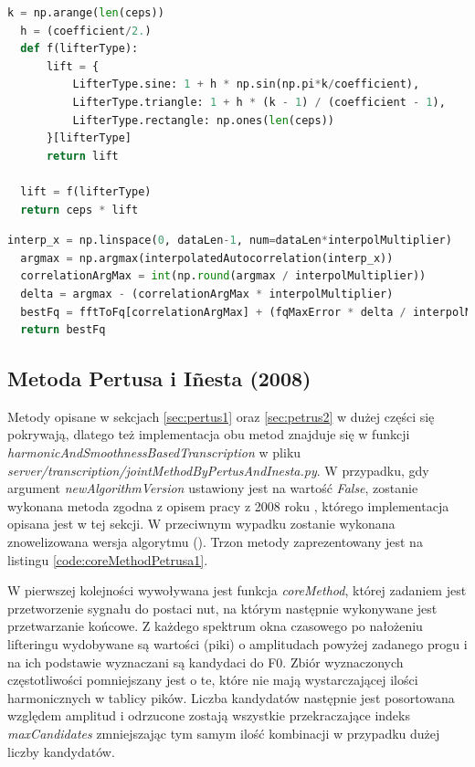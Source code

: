 \documentclass[12pt,a4paper,twoside]{mwart}
\begin{document}
\begin{lstlisting}[float, language=Python, caption={Filtrowanie w domenie quefrency}, captionpos=b, label={code:liftering}]
  k = np.arange(len(ceps))
  h = (coefficient/2.)
  def f(lifterType):
      lift = {
          LifterType.sine: 1 + h * np.sin(np.pi*k/coefficient),
          LifterType.triangle: 1 + h * (k - 1) / (coefficient - 1),
          LifterType.rectangle: np.ones(len(ceps))
      }[lifterType]
      return lift

  lift = f(lifterType)
  return ceps * lift
\end{lstlisting}

\begin{lstlisting}[float, language=Python, caption={Wyznaczanie F0 w ACLOS}, captionpos=b, label={code:bestFqInterpolate}]
  interp_x = np.linspace(0, dataLen-1, num=dataLen*interpolMultiplier)
  argmax = np.argmax(interpolatedAutocorrelation(interp_x))
  correlationArgMax = int(np.round(argmax / interpolMultiplier))
  delta = argmax - (correlationArgMax * interpolMultiplier)
  bestFq = fftToFq[correlationArgMax] + (fqMaxError * delta / interpolMultiplier)
  return bestFq
\end{lstlisting}


\subsection{Metoda Pertusa i Iñesta (2008)}\label{sec:impl:alg:specSmoothnes}
Metody opisane w sekcjach \ref{sec:pertus1} oraz \ref{sec:petrus2} w dużej części się pokrywają, dlatego też implementacja obu metod znajduje się w funkcji \textit{harmonicAndSmoothnessBasedTranscription} w pliku \textit{server/transcription/jointMethodByPertusAndInesta.py}. W przypadku, gdy argument \textit{newAlgorithmVersion} ustawiony jest na wartość \textit{False}, zostanie wykonana metoda zgodna z opisem pracy z 2008 roku \cite{Transcription:Pertus:Inharmonicity}, którego implementacja opisana jest w tej sekcji. W przeciwnym wypadku zostanie wykonana znowelizowana wersja algorytmu (\cite{Transcription:Pertus:Inharmonicity2}). Trzon metody zaprezentowany jest na listingu \ref{code:coreMethodPetrusa1}.

W pierwszej kolejności wywoływana jest funkcja \textit{coreMethod}, której zadaniem jest przetworzenie sygnału do postaci nut, na którym następnie wykonywane jest przetwarzanie końcowe. Z każdego spektrum okna czasowego po nałożeniu lifteringu wydobywane są wartości (piki) o amplitudach powyżej zadanego progu i na ich podstawie wyznaczani są kandydaci do F0. Zbiór wyznaczonych częstotliwości pomniejszany jest o te, które nie mają wystarczającej ilości harmonicznych w tablicy pików. Liczba kandydatów następnie jest posortowana względem amplitud i odrzucone zostają wszystkie przekraczające indeks \textit{maxCandidates} zmniejszając tym samym ilość kombinacji w przypadku dużej liczby kandydatów.
\end{document}
